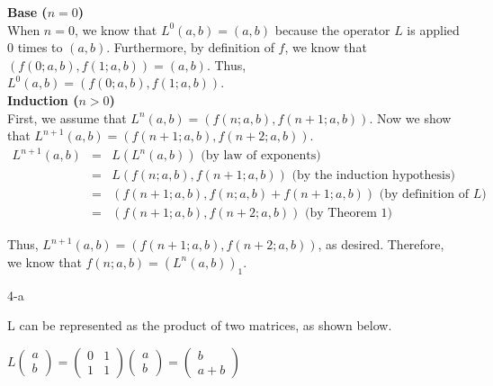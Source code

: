 \documentclass[11pt]{article}
\begin{document}
\begin{prob}{3}
\end{prob}
\begin{sol}

\textbf{Base ($n = 0$)} \\
When $n = 0$, we know that $L^{0}(a,b) = (a,b)$ because the operator $L$ is applied $0$ times to $(a,b)$. Furthermore, by definition of $f$, we know that $(f(0;a,b), f(1;a,b)) = (a,b)$. Thus, $L^{0}(a,b) = (f(0;a,b), f(1;a,b))$. \\

\textbf{Induction ($n > 0$)} \\
First, we assume that $L^{n}(a,b) = (f(n;a,b),f(n + 1;a,b))$. Now we show that $L^{n+1}(a,b) = (f(n + 1;a,b),f(n + 2;a,b))$.
\begin{eqnarray*}
L^{n + 1}(a,b) & = & L(L^{n}(a,b)) \text{ (by law of exponents)}\\
& = & L(f(n;a,b),f(n + 1;a,b)) \text{ (by the induction hypothesis)} \\
& = & (f(n + 1;a,b), f(n;a,b) + f(n + 1;a,b)) \text{ (by definition of $L$)} \\
& = & (f(n + 1;a,b), f(n + 2;a,b)) \text{ (by Theorem 1)}
\end{eqnarray*}

Thus, $L^{n+1}(a,b) = (f(n + 1;a,b),f(n + 2;a,b))$, as desired. Therefore, we know that $f(n;a,b) = (L^{n}(a,b))_{1}$.

\end{sol}

\begin{prob}{4-a}
\end{prob}
\begin{sol}

L can be represented as the product of two matrices, as shown below.
\begin{center}
$L\begin{pmatrix} a \\ b \end{pmatrix} = \begin{pmatrix} 0 & 1 \\ 1 & 1 \end{pmatrix} \begin{pmatrix} a \\ b \end{pmatrix} = \begin{pmatrix} b \\ a+b \end{pmatrix}$
\end{center}
\end{sol} 
\end{document}
